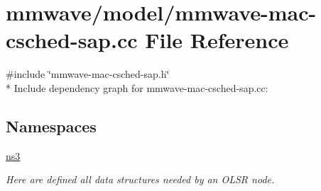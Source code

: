 \hypertarget{mmwave-mac-csched-sap_8cc}{}\section{mmwave/model/mmwave-\/mac-\/csched-\/sap.cc File Reference}
\label{mmwave-mac-csched-sap_8cc}
{\ttfamily \#include \char`\"{}mmwave-\/mac-\/csched-\/sap.\+h\char`\"{}}\\*
Include dependency graph for mmwave-\/mac-\/csched-\/sap.cc\+:
\subsection*{Namespaces}
\begin{DoxyCompactItemize}
\item 
 \hyperlink{namespacens3}{ns3}
\begin{DoxyCompactList}\small\item\em Here are defined all data structures needed by an O\+L\+SR node. \end{DoxyCompactList}\end{DoxyCompactItemize}
